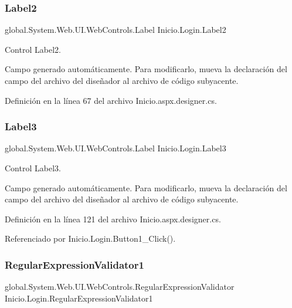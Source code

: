 \subsubsection{\texorpdfstring{Label2}{Label2}}
{\footnotesize\ttfamily global.\+System.\+Web.\+U\+I.\+Web\+Controls.\+Label Inicio.\+Login.\+Label2\hspace{0.3cm}{\ttfamily [protected]}}



Control Label2. 

Campo generado automáticamente. Para modificarlo, mueva la declaración del campo del archivo del diseñador al archivo de código subyacente. 

Definición en la línea 67 del archivo Inicio.\+aspx.\+designer.\+cs.

\mbox{\label{classInicio_1_1Login_ad052535d49bad44248dd771596f4a8af}} 
\subsubsection{\texorpdfstring{Label3}{Label3}}
{\footnotesize\ttfamily global.\+System.\+Web.\+U\+I.\+Web\+Controls.\+Label Inicio.\+Login.\+Label3\hspace{0.3cm}{\ttfamily [protected]}}



Control Label3. 

Campo generado automáticamente. Para modificarlo, mueva la declaración del campo del archivo del diseñador al archivo de código subyacente. 

Definición en la línea 121 del archivo Inicio.\+aspx.\+designer.\+cs.



Referenciado por Inicio.\+Login.\+Button1\+\_\+\+Click().

\mbox{\label{classInicio_1_1Login_aebbbf7080d71a07e72e4be45e42c6795}} 
\subsubsection{\texorpdfstring{RegularExpressionValidator1}{RegularExpressionValidator1}}
{\footnotesize\ttfamily global.\+System.\+Web.\+U\+I.\+Web\+Controls.\+Regular\+Expression\+Validator Inicio.\+Login.\+Regular\+Expression\+Validator1\hspace{0.3cm}{\ttfamily [protected]}}



